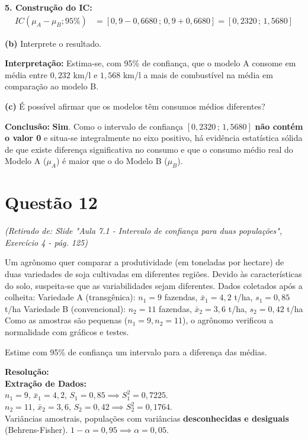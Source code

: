 \documentclass[12pt, a4paper]{article}
\begin{document}
\noindent \textbf{5. Construção do IC:}
\begin{align*}
IC(\mu_A - \mu_B; 95\%) &= [0{,}9 - 0{,}6680 \,;\, 0{,}9 + 0{,}6680] = \boxed{[0{,}2320 \,;\, 1{,}5680]}
\end{align*}

\medskip\noindent\textbf{(b)} Interprete o resultado.

\noindent \textbf{Interpretação:} Estima-se, com 95\% de confiança, que o modelo A consome em média entre $0{,}232$ km/l e $1{,}568$ km/l a mais de combustível na média em comparação ao modelo B.

\medskip\noindent\textbf{(c)} É possível afirmar que os modelos têm consumos médios diferentes?

\noindent \textbf{Conclusão:} \textbf{Sim}. Como o intervalo de confiança $[0{,}2320 \,;\, 1{,}5680]$ \textbf{não contém o valor 0} e situa-se integralmente no eixo positivo, há evidência estatística sólida de que existe diferença significativa no consumo e que o consumo médio real do Modelo A ($\mu_A$) é maior que o do Modelo B ($\mu_B$).

\section*{Questão 12}
\textit{(Retirado de: Slide "Aula 7.1 - Intervalo de confiança para duas populações", Exercício 4 - pág. 125)}

Um agrônomo quer comparar a produtividade (em toneladas por hectare) de duas variedades de soja cultivadas em diferentes regiões. Devido às características do solo, suspeita-se que as variabilidades sejam diferentes. Dados coletados após a colheita:
Variedade A (transgênica): $n_1 = 9$ fazendas, $\bar{x}_1 = 4{,}2$ t/ha, $s_1 = 0{,}85$ t/ha
Variedade B (convencional): $n_2 = 11$ fazendas, $\bar{x}_2 = 3{,}6$ t/ha, $s_2 = 0{,}42$ t/ha
Como as amostras são pequenas ($n_1 = 9, n_2 = 11$), o agrônomo verificou a normalidade com gráficos e testes.

\medskip\noindent Estime com 95\% de confiança um intervalo para a diferença das médias.

\vspace{0.3cm}
\noindent\textbf{Resolução:} \\
\textbf{Extração de Dados:} \\
$n_1 = 9$, $\bar{x}_1 = 4{,}2$, $S_1 = 0{,}85 \implies S_1^2 = 0{,}7225$. \\
$n_2 = 11$, $\bar{x}_2 = 3{,}6$, $S_2 = 0{,}42 \implies S_2^2 = 0{,}1764$. \\
Variâncias amostrais, populações com variâncias \textbf{desconhecidas e desiguais} (Behrens-Fisher). $1-\alpha = 0{,}95 \implies \alpha = 0{,}05$.
\end{document}
